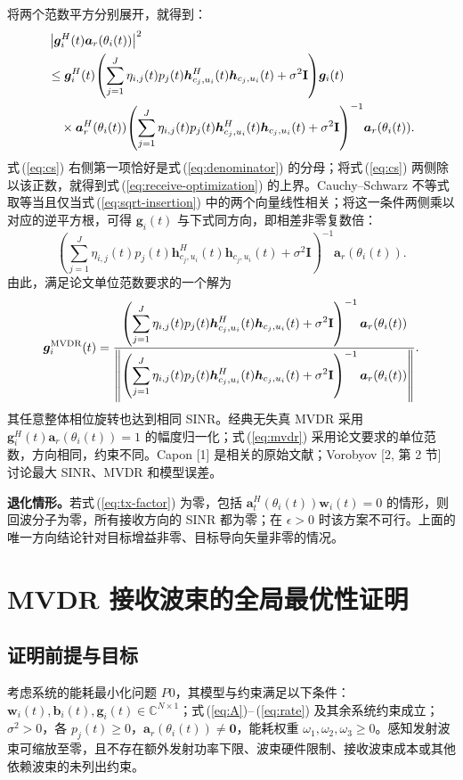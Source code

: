 \documentclass[11pt,a4paper]{ctexart}
\begin{document}
将两个范数平方分别展开，就得到：
\begin{align}
&\left|\bm g_i^H(t)\bm a_r(\theta_i(t))\right|^2\notag\\
&\le\bm g_i^H(t)\!\left(\sum_{j=1}^J\eta_{i,j}(t)p_j(t)
\bm h_{c_j,u_i}^{H}(t)\bm h_{c_j,u_i}(t)+\sigma^2\mathbf I\right)\!\bm g_i(t)\notag\\
&\quad\times\bm a_r^H(\theta_i(t))\!\left(\sum_{j=1}^J\eta_{i,j}(t)p_j(t)
\bm h_{c_j,u_i}^{H}(t)\bm h_{c_j,u_i}(t)+\sigma^2\mathbf I\right)^{-1}\!\bm a_r(\theta_i(t)).\label{eq:cs}
\end{align}
式\,(\ref{eq:cs}) 右侧第一项恰好是式\,(\ref{eq:denominator}) 的分母；将式\,(\ref{eq:cs}) 两侧除以该正数，就得到式\,(\ref{eq:receive-optimization}) 的上界。Cauchy--Schwarz 不等式取等当且仅当式\,(\ref{eq:sqrt-insertion}) 中的两个向量线性相关；将这一条件两侧乘以对应的逆平方根，可得 $\bm g_i(t)$ 与下式同方向，即相差非零复数倍：
\begin{equation}\label{eq:direction}
\left(\sum_{j=1}^J\eta_{i,j}(t)p_j(t)
\bm h_{c_j,u_i}^{H}(t)\bm h_{c_j,u_i}(t)+\sigma^2\mathbf I\right)^{-1}
\bm a_r(\theta_i(t)).
\end{equation}
由此，满足论文单位范数要求的一个解为
\begin{equation}\label{eq:mvdr}
\bm g_i^{\rm MVDR}(t)=
\frac{\left(\displaystyle\sum_{j=1}^J\eta_{i,j}(t)p_j(t)
\bm h_{c_j,u_i}^{H}(t)\bm h_{c_j,u_i}(t)+\sigma^2\mathbf I\right)^{-1}
\bm a_r(\theta_i(t))}
{\left\|\left(\displaystyle\sum_{j=1}^J\eta_{i,j}(t)p_j(t)
\bm h_{c_j,u_i}^{H}(t)\bm h_{c_j,u_i}(t)+\sigma^2\mathbf I\right)^{-1}
\bm a_r(\theta_i(t))\right\|}.
\end{equation}
其任意整体相位旋转也达到相同 SINR。经典无失真 MVDR 采用 $\bm g_i^H(t)\bm a_r(\theta_i(t))=1$ 的幅度归一化；式\,(\ref{eq:mvdr}) 采用论文要求的单位范数，方向相同，约束不同。Capon [1] 是相关的原始文献；Vorobyov [2, 第 2 节] 讨论最大 SINR、MVDR 和模型误差。

\textbf{退化情形。}若式\,(\ref{eq:tx-factor}) 为零，包括 $\bm a_t^H(\theta_i(t))\bm w_i(t)=0$ 的情形，则回波分子为零，所有接收方向的 SINR 都为零；在 $\epsilon>0$ 时该方案不可行。上面的唯一方向结论针对目标增益非零、目标导向矢量非零的情况。

\section{MVDR 接收波束的全局最优性证明}
\subsection{证明前提与目标}
考虑系统的能耗最小化问题 $P0$，其模型与约束满足以下条件：$\bm w_i(t),\bm b_i(t),\bm g_i(t)\in\mathbb C^{N\times1}$；式\,(\ref{eq:A})--\,(\ref{eq:rate}) 及其余系统约束成立；$\sigma^2>0$，各 $p_j(t)\ge0$，$\bm a_r(\theta_i(t))\ne\bm0$，能耗权重 $\omega_1,\omega_2,\omega_3\ge0$。感知发射波束可缩放至零，且不存在额外发射功率下限、波束硬件限制、接收波束成本或其他依赖波束的未列出约束。
\end{document}
